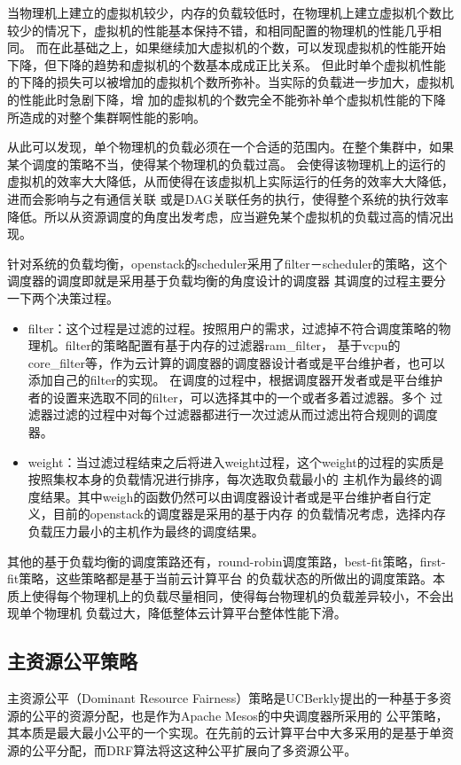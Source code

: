 当物理机上建立的虚拟机较少，内存的负载较低时，在物理机上建立虚拟机个数比较少的情况下，虚拟机的性能基本保持不错，和相同配置的物理机的性能几乎相同。
而在此基础之上，如果继续加大虚拟机的个数，可以发现虚拟机的性能开始下降，但下降的趋势和虚拟机的个数基本成成正比关系。
但此时单个虚拟机性能的下降的损失可以被增加的虚拟机个数所弥补。当实际的负载进一步加大，虚拟机的性能此时急剧下降，增
加的虚拟机的个数完全不能弥补单个虚拟机性能的下降所造成的对整个集群啊性能的影响。

从此可以发现，单个物理机的负载必须在一个合适的范围内。在整个集群中，如果某个调度的策略不当，使得某个物理机的负载过高。
会使得该物理机上的运行的虚拟机的效率大大降低，从而使得在该虚拟机上实际运行的任务的效率大大降低，进而会影响与之有通信关联
或是DAG关联任务的执行，使得整个系统的执行效率降低。所以从资源调度的角度出发考虑，应当避免某个虚拟机的负载过高的情况出现。

针对系统的负载均衡，openstack的scheduler采用了filter－scheduler的策略，这个调度器的调度即就是采用基于负载均衡的角度设计的调度器
其调度的过程主要分一下两个决策过程。
\begin{itemize}
\item filter：这个过程是过滤的过程。按照用户的需求，过滤掉不符合调度策略的物理机。filter的策略配置有基于内存的过滤器ram\_filter，
基于vcpu的core\_filter等，作为云计算的调度器的调度器设计者或是平台维护者，也可以添加自己的filter的实现。
在调度的过程中，根据调度器开发者或是平台维护者的设置来选取不同的filter，可以选择其中的一个或者多着过滤器。多个
过滤器过滤的过程中对每个过滤器都进行一次过滤从而过滤出符合规则的调度器。
\item weight：当过滤过程结束之后将进入weight过程，这个weight的过程的实质是按照集权本身的负载情况进行排序，每次选取负载最小的
主机作为最终的调度结果。其中weigh的函数仍然可以由调度器设计者或是平台维护者自行定义，目前的openstack的调度器是采用的基于内存
的负载情况考虑，选择内存负载压力最小的主机作为最终的调度结果。
\end{itemize}

其他的基于负载均衡的调度策路还有，round-robin调度策路，best-fit策略，first-fit策略，这些策略都是基于当前云计算平台
的负载状态的所做出的调度策路。本质上使得每个物理机上的负载尽量相同，使得每台物理机的负载差异较小，不会出现单个物理机
负载过大，降低整体云计算平台整体性能下滑。

\subsection{主资源公平策略}
主资源公平（Dominant Resource Fairness）策略是UCBerkly提出的一种基于多资源的公平的资源分配，也是作为Apache Mesos的中央调度器所采用的
公平策略，其本质是最大最小公平的一个实现。在先前的云计算平台中大多采用的是基于单资源的公平分配，而DRF算法将这这种公平扩展向了多资源公平。

